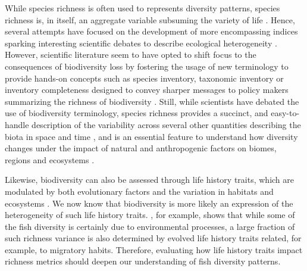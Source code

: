 \documentclass[12pt,authoryear]{elsarticle}
\begin{document}
While species richness is often used to represents diversity patterns, species richness is, in itself, an aggregate variable subsuming the variety of life \citep{Marquet2004}. Hence, several attempts have focused on the development of more encompassing indices sparking interesting scientific debates to describe ecological heterogeneity \citep{tuomisto_commentary_2011, moreno_commentary_2011, daly_ecological_2018}. However, scientific literature seem to have opted to shift focus to the consequences of biodiversity loss by fostering the usage of new terminology to provide hands-on concepts such as species inventory, taxonomic inventory or inventory completeness designed to convey sharper messages to policy makers summarizing the richness of biodiversity \citep{pereira_essential_2013, butchart_global_2010}. Still, while scientists have debated the use of biodiversity terminology, species richness provides a succinct, and easy-to-handle description of the variability across several other quantities describing the biota in space and time \citep{APPELTANS2012}, and is an essential feature to understand how diversity changes under the impact of natural and anthropogenic factors on biomes, regions and ecosystems \citep{troia2017, magurran2011}. 

Likewise, biodiversity can also be assessed through life history traits, which are modulated by both evolutionary factors and the variation in habitats and ecosystems \citep{neigel_book_1997, hutchings2005measuring}. We now know that biodiversity is more likely an expression of the heterogeneity of such life history traits. \citealt{alo2021macroecology}, for example, shows that while some of the fish diversity is certainly due to environmental processes, a large fraction of such richness variance is also determined by evolved life history traits related, for example, to migratory habits. Therefore, evaluating how life history traits impact richness metrics should deepen our understanding of fish diversity patterns.
\end{document}
